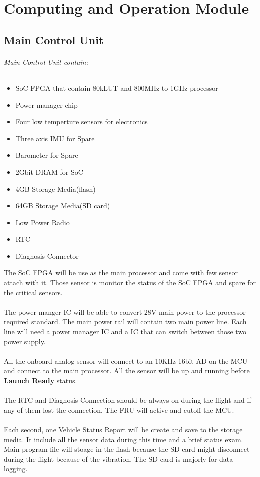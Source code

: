 \documentclass[12pt,article]{memoir}
\begin{document}
\chapter{Computing and Operation Module}
\section{Main Control Unit}
\subparagraph{Main Control Unit contain:}
\begin{itemize}
	\item SoC FPGA that contain 80kLUT and 800MHz to 1GHz processor
	\item Power manager chip 
	\item Four low temperture sensors for electronics
	\item Three axis IMU for Spare
	\item Barometer for Spare
	\item 2Gbit DRAM for SoC
	\item 4GB Storage Media(flash)
	\item 64GB Storage Media(SD card)
	\item Low Power Radio
	\item RTC
	\item Diagnosis Connector
\end{itemize}
The SoC FPGA will be use as the main processor and come with few sensor attach with it. Those sensor is monitor the status of the SoC FPGA and spare for the critical sensors.\\\\
The power manger IC will be able to convert 28V main power to the processor required standard. The main power rail will contain two main power line. Each line will need a power manager IC and a IC that can switch between those two power supply.\\\\
All the onboard analog sensor will connect to an 10KHz 16bit AD on the MCU and connect to the main processor. All the sensor will be up and running before \textbf{Launch Ready} status.\\\\
The RTC and Diagnosis Connection should be always on during the flight and if any of them lost the connection. The FRU will active and cutoff the MCU.\\\\
Each second, one Vehicle Status Report will be create and save to the storage media. It include all the sensor data during this time and a brief status exam. Main program file will stoage in the flash because the SD card might disconnect during the flight because of the vibration. The SD card is majorly for data logging.
\end{document}
